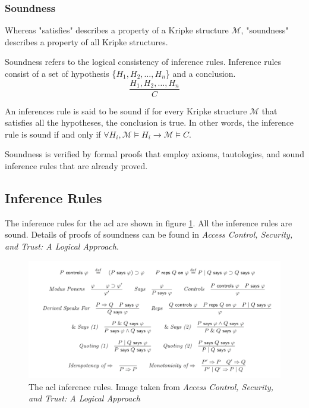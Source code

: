 \documentclass[../../main/main.tex]{subfiles}
\begin{document}

\subsubsection{Soundness}\label{sssec:soundness}
Whereas "satisfies" describes a property of a Kripke structure $\mathcal{M}$, "soundness" describes a property of all Kripke structures. 

Soundness refers to the logical consistency of inference rules.  Inference rules consist of a set of hypothesis \{$H_1, H_2, \dots , H_n$\} and a conclusion. 
\begin{equation*}
\frac{H_1, H_2, \dots , H_n}{C}
\end{equation*}

An inferences rule is said to be sound if for every Kripke structure $\mathcal{M}$ that satisfies all the hypotheses, the conclusion is true. In other words,  the inference rule is sound if and only if $\forall H_i, \mathcal{M} \models H_i \longrightarrow \mathcal{M} \models C$.

Soundness is verified by formal proofs that employ axioms, tautologies, and sound inference rules that are already proved.  

\subsection{Inference Rules}\label{ssec:inferencerules}
The inference rules for the \gls{acl} are shown in figure \ref{inferencerules}.  All the inference rules are sound.  Details of proofs of soundness can be found in \textit{Access Control, Security, and Trust: A Logical Approach}\cite{ChinOlder}.

\begin{figure}[h]
\centering
\includegraphics[width=\textwidth]{../figures/inferencerules}
\caption{\label{inferencerules}The \gls{acl} inference rules. Image taken from \textit{Access Control, Security, and Trust: A Logical Approach}\cite{ChinOlder}}
\end{figure}
\end{document}
